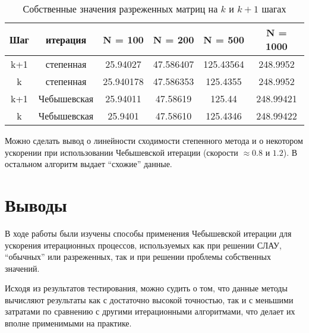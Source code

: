 \documentclass[12pt]{article}
\begin{document}
\begin{table}[h!]
    \caption{Собственные значения разреженных матриц на $k$ и $k+1$ шагах}
\begin{center}
 \begin{tabular}{|c|c|c|c|c|c|} 
 \hline
 Шаг & итерация & N = 100 & N = 200 & N = 500 & N = 1000 \\
\hline
k+1 & степенная & 25.94027 & 47.586407 & 125.43564 & 248.9952 \\
\hline
k & степенная     & 25.940178 & 47.586353 & 125.4355 & 248.9952 \\
\hline
k+1& Чебышевская & 25.94011 & 47.58619 & 125.44 & 248.99421 \\
\hline
k& Чебышевская     & 25.9401 &  47.58610 & 125.4346 & 248.99422 \\
\hline
\end{tabular}
\end{center}

	Можно сделать вывод о линейности сходимости степенного метода и о некотором ускорении при использовании Чебышевской итерации (скорости $\approx 0.8$ и $1.2$). В остальном алгоритм выдает ``схожие'' данные.

    \end{table}
    {
        \section{Выводы}
        
    }
    
    В ходе работы были изучены способы применения Чебышевской итерации для ускорения итерационных процессов, используемых как при решении СЛАУ, ``обычных'' или разреженных, так и при решении проблемы собственных значений. 
    
	Исходя из результатов тестирования, можно судить о том, что данные методы вычисляют результаты как с достаточно высокой точностью, так и с меньшими затратами по сравнению с другими итерационными алгоритмами, что делает их вполне применимыми на практике.
	
   
    
\end{document}
